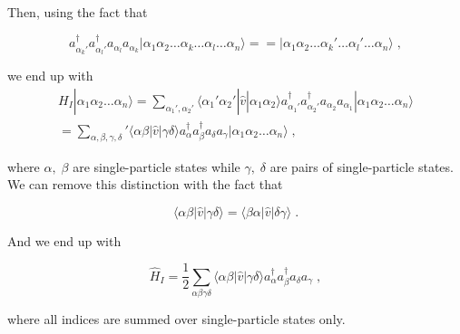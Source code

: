 Then, using the fact that

\begin{equation}
    a_{\alpha_k'}^{\dagger} a_{\alpha_l'}^{\dagger} a_{\alpha_l} a_{\alpha_k} 
    	|\alpha_1\alpha_2\dots\alpha_k\dots\alpha_l\dots\alpha_n\rangle  = 
    = |\alpha_1\alpha_2\dots\alpha_k'\dots\alpha_l'\dots\alpha_n\rangle \; ,\label{eq:2-35}
\end{equation}

we end up with
\begin{equation}
\begin{gathered}
    H_I |\alpha_1\alpha_2\dots\alpha_n\rangle
    = \sum_{\alpha_1', \alpha_2'} \langle \alpha_1'\alpha_2'|\hat{v}|\alpha_1\alpha_2\rangle
    	a_{\alpha_1'}^{\dagger} a_{\alpha_2'}^{\dagger} a_{\alpha_2} a_{\alpha_1}
    	|\alpha_1\alpha_2\dots\alpha_n\rangle  \\
    = \sum_{\alpha, \beta, \gamma, \delta} ' \langle \alpha\beta|\hat{v}|\gamma\delta\rangle
    	a^{\dagger}_\alpha a^{\dagger}_\beta a_\delta a_\gamma
    	|\alpha_1\alpha_2\dots\alpha_n\rangle \label{eq:2-36} \; ,
\end{gathered}
\end{equation}

where $\alpha, \; \beta$ are single-particle states while $\gamma, \; \delta$ are pairs of single-particle states. We can remove this distinction with the fact that

\begin{equation}
    \langle \alpha\beta|\hat{v}|\gamma\delta\rangle = \langle \beta\alpha|\hat{v}|\delta\gamma\rangle \label{eq:2-37} \; .
\end{equation}

And we end up with

\begin{equation}
    \hat{H}_I = \frac{1}{2} \sum_{\alpha\beta\gamma\delta} \langle \alpha\beta|\hat{v}|\gamma\delta\rangle
    	a^{\dagger}_\alpha a^{\dagger}_\beta a_\delta a_\gamma \label{eq:2-39} \; ,
\end{equation}

where all indices are summed over single-particle states only.



